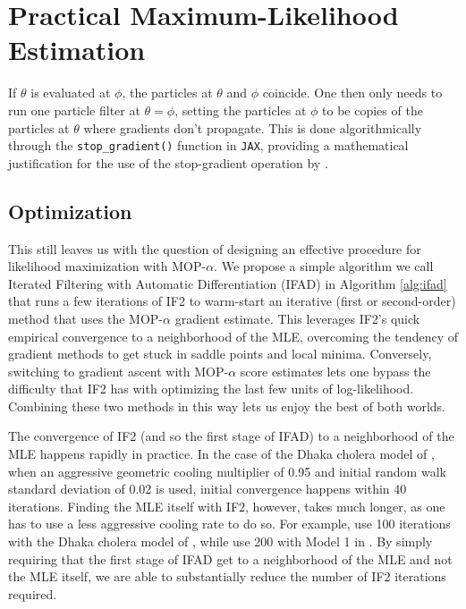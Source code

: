 \documentclass[11pt]{article}
\begin{document}
\section{Practical Maximum-Likelihood Estimation}


If $\theta$ is evaluated at $\phi$, the particles at $\theta$ and $\phi$ coincide. One then only needs to run one particle filter at $\theta=\phi$, setting the particles at $\phi$ to be copies of the particles at $\theta$ where gradients don't propagate. This is done algorithmically through the \texttt{stop\_gradient()} function in \texttt{JAX}, providing a mathematical justification for the use of the stop-gradient operation by \cite{scibior21}.

\subsection{Optimization}

This still leaves us with the question of designing an effective procedure for likelihood maximization with MOP-$\alpha$. We propose a simple algorithm we call Iterated Filtering with Automatic Differentiation (IFAD) in Algorithm \ref{alg:ifad} that runs a few iterations of IF2 to warm-start an iterative (first or second-order) method that uses the MOP-$\alpha$ gradient estimate. This leverages IF2's quick empirical convergence to a neighborhood of the MLE, overcoming the tendency of gradient methods to get stuck in saddle points and local minima. Conversely, switching to gradient ascent with MOP-$\alpha$ score estimates lets one bypass the difficulty that IF2 has with optimizing the last few units of log-likelihood. Combining these two methods in this way lets us enjoy the best of both worlds.

The  convergence of IF2 (and so the first stage of IFAD) to a neighborhood of the MLE happens rapidly in practice. 
In the case of the Dhaka cholera model of \cite{king08}, when an aggressive geometric cooling multiplier of 0.95 and initial random walk standard deviation of 0.02 is used, initial convergence happens within 40 iterations. 
Finding the MLE itself with IF2, however, takes much longer, as one has to use a less aggressive cooling rate to do so. 
For example, \cite{ionides15} use 100 iterations with the Dhaka cholera model of \cite{king08}, while \cite{wheeler23} use 200 with Model 1 in \cite{lee20}. 
By simply requiring that the first stage of IFAD get to a neighborhood of the MLE and not the MLE itself, we are able to substantially reduce the number of IF2 iterations required. 
\end{document}
